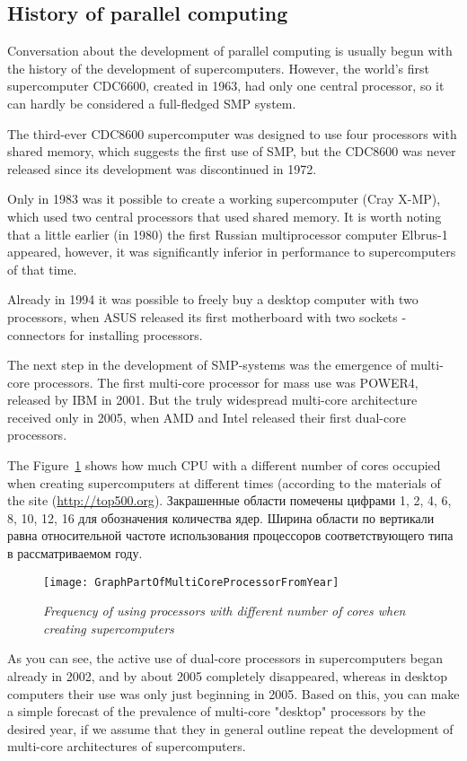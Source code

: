{ %
	\subsection{History of parallel computing}
	\par Conversation about the development of parallel computing is usually begun with the history of the development of supercomputers. However, the world's first supercomputer CDC6600, created in 1963, had only one central processor, so it can hardly be considered a full-fledged SMP system.
	\par The third-ever CDC8600 supercomputer was designed to use four processors with shared memory, which suggests the first use of SMP, but the CDC8600 was never released since its development was discontinued in 1972.
	\par Only in 1983 was it possible to create a working supercomputer (Cray X-MP), which used two central processors that used shared memory. It is worth noting that a little earlier (in 1980) the first Russian multiprocessor computer Elbrus-1 appeared, however, it was significantly inferior in performance to supercomputers of that time.
	\par Already in 1994 it was possible to freely buy a desktop computer with two processors, when ASUS released its first motherboard with two sockets - connectors for installing processors.
	\par The next step in the development of SMP-systems was the emergence of multi-core processors. The first multi-core processor for mass use was POWER4, released by IBM in 2001. But the truly widespread multi-core architecture received only in 2005, when AMD and Intel released their first dual-core processors.
	\par The Figure~\ref{GraphPartOfMultiCoreProcessorFromYear:image} shows how much CPU with a different number of cores occupied when creating supercomputers at different times (according to the materials of the site (\url{http://top500.org}). Закрашенные области помечены цифрами 1, 2, 4, 6, 8, 10, 12, 16 для обозначения количества ядер. Ширина области по вертикали равна относительной частоте использования процессоров соответствующего типа в рассматриваемом году.
	\begin{figure}[H]
		\texttt{[image: GraphPartOfMultiCoreProcessorFromYear]}
		\caption{\textit{Frequency of using processors with different number of cores when creating supercomputers}}
		\label{GraphPartOfMultiCoreProcessorFromYear:image}
	\end{figure}
	\par As you can see, the active use of dual-core processors in supercomputers began already in 2002, and by about 2005 completely disappeared, whereas in desktop computers their use was only just beginning in 2005. Based on this, you can make a simple forecast of the prevalence of multi-core "desktop" processors by the desired year, if we assume that they in general outline repeat the development of multi-core architectures of supercomputers.
	\par
}